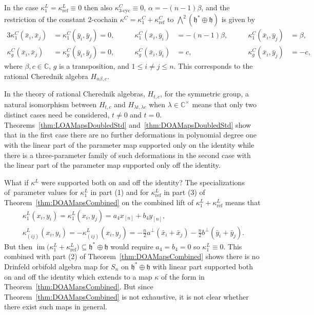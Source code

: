 \documentclass[10pt,a4paper]{amsart}
\numberwithin{equation}{section}
\DeclareMathOperator{\im}{im}
\DeclareMathOperator{\refl}{ref}
\DeclareMathOperator{\tri}{3-cyc}
\begin{document}
\begin{Remark}\label{RecoverGHAs}
In the case $\kappa^L_1=\kappa^L_{\refl} \equiv 0$ then also $\kappa^C_{\tri}\equiv 0$,
$\alpha=-(n-1)\beta$, and the restriction of the constant $2$-cochain
$\kappa^C=\kappa^C_1+\kappa^C_{\refl}$ to $\bigwedge^2 (\mathfrak{h}^*\oplus\mathfrak{h})$ is given by
\begin{alignat*}{3}
\kappa^C_1(\bar{x}_i,\bar{x}_j)&=\kappa^C_1(\bar{y}_i,\bar{y}_j)=0, &\qquad \kappa^C_1(\bar{x}_i,\bar{y}_i)&=-(n-1)\beta, &\qquad \kappa^C_1(\bar{x}_i,\bar{y}_j)&=\beta,
\\
\kappa^C_g(\bar{x}_i,\bar{x}_j)&=\kappa^C_g(\bar{y}_i,\bar{y}_j)=0, &\qquad \kappa^C_g(\bar{x}_i,\bar{y}_i)&=c, &\qquad \kappa^C_g(\bar{x}_i,\bar{y}_j)&=-c,
\end{alignat*}
where $\beta,c \in \mathbb{C}$, $g$ is a transposition, and $1 \leq i \neq j \leq n$.
This corresponds to the rational Cherednik algebra $H_{n\beta,c}$.
\end{Remark}

In the theory of rational Cherednik algebras, $H_{t,c}$, for the
symmetric group, a natural isomorphism between $H_{t,c}$ and
$H_{\lambda t, \lambda c}$ when $\lambda \in \mathbb{C}^\times$
means that only two distinct cases need be considered, $t\neq 0$ and $t=0$.
Theorems~\ref{thm:LOAMapsDoubledStd} and~\ref{thm:DOAMapsDoubledStd}
show that in the first case there are no further deformations in polynomial
degree one with the linear part of the parameter map supported only on the
identity while there is a three-parameter family of such deformations in the
second case with the linear part of the parameter map supported only off the
identity.

\begin{Remark}\label{NoExtensionsOfExamples}
What if $\kappa^L$ were supported both on and off the
identity? The specializations of~parameter values for $\kappa^L_1$ in
part (1) and for $\kappa^L_{\refl}$ in part (3) of
Theorem~\ref{thm:DOAMapsCombined} on the combined lift of
$\kappa^L_1+\kappa^L_{\refl}$ means that
\begin{gather*}
\kappa^L_1(x_i,y_i)=\kappa^L_1(x_i,y_j)=a_4x_{[n]}+b_4y_{[n]},
\\
\kappa^L_{(ij)}(x_i,y_i)=-\kappa^L_{(ij)}(x_i,y_j)=
-\frac{n}{2}a^\perp(\bar{x}_i+\bar{x}_j)
-\frac{n}{2}b^\perp(\bar{y}_i+\bar{y}_j).
\end{gather*}
But then $\im\big(\kappa^L_1+\kappa^L_{\refl}\big) \subseteq \mathfrak{h}^*\oplus\mathfrak{h}$ would
require $a_4=b_4=0$ so $\kappa^L_1\equiv 0$. This combined with part (2) of
Theorem~\ref{thm:DOAMapsCombined} shows there is no Drinfeld orbifold
algebra map for $S_n$ on $\mathfrak{h}^*\oplus\mathfrak{h}$ with linear part supported both on
and off the identity which extends to a map $\kappa$ of the form in
Theorem~\ref{thm:DOAMapsCombined}. But since Theorem~\ref{thm:DOAMapsCombined}
is not exhaustive, it is not clear whether there exist such maps in general.
\end{Remark}
\end{document}
